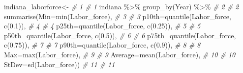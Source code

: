 \documentclass[
]{book}
\newenvironment{Shaded}{\begin{snugshade}}{\end{snugshade}}
\newcommand{\AttributeTok}[1]{\textcolor[rgb]{0.77,0.63,0.00}{#1}}
\newcommand{\CommentTok}[1]{\textcolor[rgb]{0.56,0.35,0.01}{\textit{#1}}}
\newcommand{\FloatTok}[1]{\textcolor[rgb]{0.00,0.00,0.81}{#1}}
\newcommand{\FunctionTok}[1]{\textcolor[rgb]{0.00,0.00,0.00}{#1}}
\newcommand{\NormalTok}[1]{#1}
\newcommand{\OtherTok}[1]{\textcolor[rgb]{0.56,0.35,0.01}{#1}}
\newcommand{\SpecialCharTok}[1]{\textcolor[rgb]{0.00,0.00,0.00}{#1}}
\begin{document}
\begin{Shaded}
\begin{Highlighting}[]
\NormalTok{indiana\_laborforce}\OtherTok{\textless{}{-}}                       \CommentTok{\# 1   \# 1}
\NormalTok{  indiana }\SpecialCharTok{\%\textgreater{}\%} \FunctionTok{group\_by}\NormalTok{(Year) }\SpecialCharTok{\%\textgreater{}\%}           \CommentTok{\# 2   \# 2}
  \FunctionTok{summarise}\NormalTok{(}\AttributeTok{Min=}\FunctionTok{min}\NormalTok{(Labor\_force),          }\CommentTok{\# 3   \# 3}
    \AttributeTok{p10th=}\FunctionTok{quantile}\NormalTok{(Labor\_force, }\FunctionTok{c}\NormalTok{(}\FloatTok{0.1}\NormalTok{)),   }\CommentTok{\# 4   \# 4}
    \AttributeTok{p25th=}\FunctionTok{quantile}\NormalTok{(Labor\_force, }\FunctionTok{c}\NormalTok{(}\FloatTok{0.25}\NormalTok{)),  }\CommentTok{\# 5   \# 5}
    \AttributeTok{p50th=}\FunctionTok{quantile}\NormalTok{(Labor\_force, }\FunctionTok{c}\NormalTok{(}\FloatTok{0.5}\NormalTok{)),   }\CommentTok{\# 6   \# 6}
    \AttributeTok{p75th=}\FunctionTok{quantile}\NormalTok{(Labor\_force, }\FunctionTok{c}\NormalTok{(}\FloatTok{0.75}\NormalTok{)),  }\CommentTok{\# 7   \# 7}
    \AttributeTok{p90th=}\FunctionTok{quantile}\NormalTok{(Labor\_force, }\FunctionTok{c}\NormalTok{(}\FloatTok{0.9}\NormalTok{)),   }\CommentTok{\# 8   \# 8}
    \AttributeTok{Max=}\FunctionTok{max}\NormalTok{(Labor\_force),                  }\CommentTok{\# 9   \# 9}
    \AttributeTok{Average=}\FunctionTok{mean}\NormalTok{(Labor\_force),            }\CommentTok{\# 10  \# 10}
    \AttributeTok{StDev=}\FunctionTok{sd}\NormalTok{(Labor\_force))                }\CommentTok{\# 11  \# 11}
\end{Highlighting}
\end{Shaded}
\end{document}
